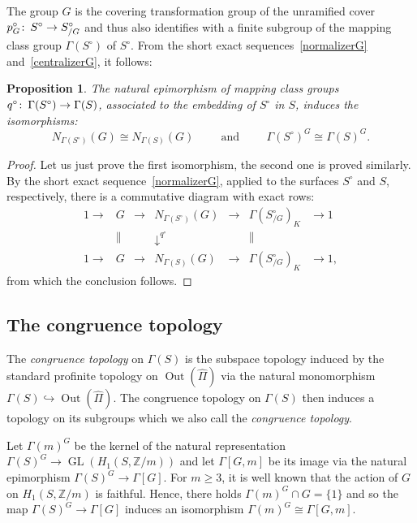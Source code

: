 \documentclass[12pt,twoside]{amsart}
\newtheorem{proposition}[theorem]{Proposition}
\theoremstyle{definition}
\newcommand{\Z}{\mathbb{Z}}
\def\GL{\operatorname{GL}}
\def\Out{\operatorname{Out}}
\def\hP{{\widehat\Pi}}
\def\G{{\Gamma}}
\def\da{\downarrow}
\def\hookra{\hookrightarrow}
\def\co{\colon\thinspace}
\begin{document}
The group $G$ is the covering transformation group of the unramified cover $p_G^\circ\co S^\circ\to S_{/G}^\circ$ and thus also identifies 
with a finite subgroup of the mapping class group $\G(S^\circ)$ of $S^\circ$.
From the short exact sequences~\eqref{normalizerG} and~\eqref{centralizerG}, it follows:

\begin{proposition}\label{comparison}The natural epimorphism of mapping class groups $q^\circ\co\G(S^\circ)\to\G(S)$, associated to the embedding
of $S^\circ$ in $S$, induces the isomorphisms: 
\[N_{\G(S^\circ)}(G)\cong N_{\G(S)}(G)\hspace{1cm}\mbox{and}\hspace{1cm}\G(S^\circ)^G\cong\G(S)^G.\]
\end{proposition}

\begin{proof}Let us just prove the first isomorphism, the second one is proved similarly. By the short exact sequence~\eqref{normalizerG},
applied to the surfaces $S^\circ$ and $S$, respectively, there is a commutative diagram with exact rows:
\[\begin{array}{ccccccc}
1\to&G&\to&N_{\G(S^\circ)}(G)&\to&\G(S_{/G}^\circ)_K&\to 1\,\\
&\parallel&&\da^{q^\circ}&&\parallel&\\
1\to&G&\to&N_{\G(S)}(G)&\to&\G(S_{/G}^\circ)_K&\to 1,
\end{array}\]
from which the conclusion follows.
\end{proof}



\subsection{The congruence topology}\label{congtopology}
The \emph{congruence topology} on $\G(S)$ is the subspace topology induced by the standard profinite topology on $\Out(\hP)$ 
via the natural monomorphism $\G(S)\hookra\Out(\hP)$. The congruence topology on $\G(S)$ then induces a topology on its subgroups
which we also call the \emph{congruence topology}.

Let $\G(m)^G$ be the kernel of the natural representation $\G(S)^G\to\GL(H_1(S,\Z/m))$ and let $\G[G,m]$
be its image via the natural epimorphism $\G(S)^G\to\G[G]$. For $m\geq 3$, it is well known that the action of $G$ on $H_1(S,\Z/m)$
is faithful. Hence, there holds $\G(m)^G\cap G=\{1\}$ and so the map
$\G(S)^G\to\G[G]$ induces an isomorphism $\G(m)^G\cong\G[G,m]$. 
\end{document}
